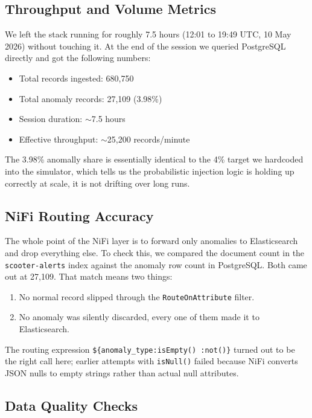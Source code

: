 \documentclass[conference]{IEEEtran}
\begin{document}
\subsection{Throughput and Volume Metrics}

We left the stack running for roughly 7.5 hours (12:01 to 19:49 UTC, 10 May 2026) without touching it. At the end of the session we queried PostgreSQL directly and got the following numbers:

\begin{itemize}
    \item Total records ingested: 680,750
    \item Total anomaly records: 27,109 (3.98\%)
    \item Session duration: $\sim$7.5 hours
    \item Effective throughput: $\sim$25,200 records/minute
\end{itemize}

The 3.98\% anomally share is essentially identical to the 4\% target we hardcoded into the simulator, which tells us the probabilistic injection logic is holding up correctly at scale, it is not drifting over long runs.

\subsection{NiFi Routing Accuracy}

The whole point of the NiFi layer is to forward only anomalies to Elasticsearch and drop everything else. To check this, we compared the document count in the \texttt{scooter-alerts} index against the anomaly row count in PostgreSQL. Both came out at 27,109. That match means two things:

\begin{enumerate}
    \item No normal record slipped through the \texttt{RouteOnAttribute} filter.
    \item No anomaly was silently discarded, every one of them made it to Elasticsearch.
\end{enumerate}

The routing expression \texttt{\$\{anomaly\_type:isEmpty() :not()\}} turned out to be the right call here; earlier attempts with \texttt{isNull()} failed because NiFi converts JSON nulls to empty strings rather than actual null attributes.

\subsection{Data Quality Checks}
\end{document}
